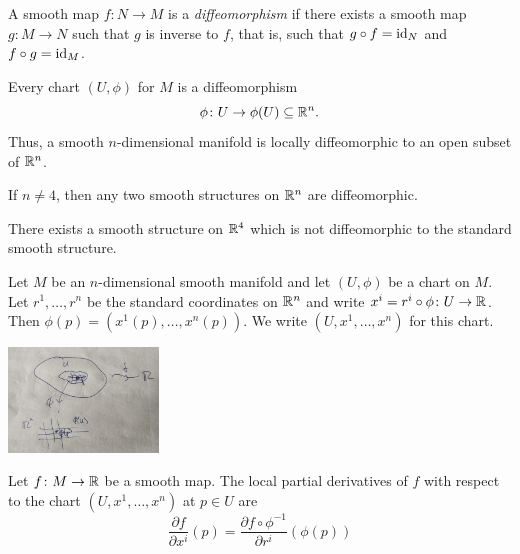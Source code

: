 \begin{frame}
  \begin{defn}
    A smooth map $f \colon N \to M$ is a {\em diffeomorphism} if there
    exists a smooth map $g \colon M \to N$ such that $g$ is inverse to $f$,
    that is, such that $g \circ f = \operatorname{id}_N$ and $f \circ g = \operatorname{id}_M$.
  \end{defn}
  \begin{example}
    Every chart $(U, \phi)$ for $M$ is a diffeomorphism
    \begin{displaymath}
      \phi \colon U \to \phi(U) \subseteq \mathbb R^n.
    \end{displaymath}
    Thus, a smooth $n$-dimensional manifold is locally 
    diffeomorphic to an open subset of $\mathbb R^n$.
  \end{example}
  \begin{thm}
    If $n \ne 4$, then any two smooth structures on $\mathbb R^n$ are
    diffeomorphic.
  \end{thm}
  \begin{thm}
    There exists a smooth structure on $\mathbb R^4$ which is not 
    diffeomorphic to the standard smooth structure.
  \end{thm}
\end{frame}
\begin{frame}
  Let $M$ be an $n$-dimensional smooth manifold and let $(U, \phi)$ 
  be a chart on $M$. Let $r^1, \dots, r^n$ be the standard coordinates
  on $\mathbb R^n$ and write $x^i = r^i \circ \phi \colon U \to \mathbb R$.
  Then $\phi(p) = (x^1(p), \dots, x^n(p))$. We write $(U, x^1, \dots, x^n)$
  for this chart.
  \begin{center}
    \includegraphics[width=0.3\textwidth]{figures/coordinates.jpg}
  \end{center}
  \begin{defn}
    Let $f \colon M \to \mathbb R$ be a smooth map. The local partial derivatives
    of $f$ with respect to the chart $(U, x^1, \dots, x^n)$ at $p \in U$
    are
    \begin{displaymath}
      \frac{\partial f}{\partial x^i}(p) = \frac{\partial f \circ \phi^{-1}}
      {\partial r^i}(\phi(p))
    \end{displaymath}
  \end{defn}
\end{frame}
